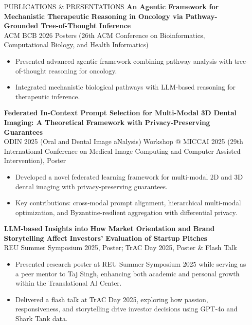 \documentclass{resume} %
\begin{document}
\begin{rSection}{PUBLICATIONS \& PRESENTATIONS}
\textbf{An Agentic Framework for Mechanistic Therapeutic Reasoning in Oncology via Pathway-Grounded Tree-of-Thought Inference} \\
ACM BCB 2026 Posters (26th ACM Conference on Bioinformatics, Computational Biology, and Health Informatics)
\begin{itemize}
    \item Presented advanced agentic framework combining pathway analysis with tree-of-thought reasoning for oncology.
    \item Integrated mechanistic biological pathways with LLM-based reasoning for therapeutic inference.
\end{itemize}

\textbf{Federated In-Context Prompt Selection for Multi-Modal 3D Dental Imaging: A Theoretical Framework with Privacy-Preserving Guarantees} \\
ODIN 2025 (Oral and Dental Image aNalysis) Workshop @ MICCAI 2025 (29th International Conference on Medical Image Computing and Computer Assisted Intervention), Poster
\begin{itemize}
    \item Developed a novel federated learning framework for multi-modal 2D and 3D dental imaging with privacy-preserving guarantees.
    \item Key contributions: cross-modal prompt alignment, hierarchical multi-modal optimization, and Byzantine-resilient aggregation with differential privacy.
\end{itemize}

\textbf{LLM-based Insights into How Market Orientation and Brand Storytelling Affect Investors' Evaluation of Startup Pitches} \\
REU Summer Symposium 2025, Poster; TrAC Day 2025, Poster \& Flash Talk
\begin{itemize}
    \item Presented research poster at REU Summer Symposium 2025 while serving as a peer mentor to Taj Singh, enhancing both academic and personal growth within the Translational AI Center.
    \item Delivered a flash talk at TrAC Day 2025, exploring how passion, responsiveness, and storytelling drive investor decisions using GPT-4o and Shark Tank data.
\end{itemize}


\end{rSection}
\end{document}
